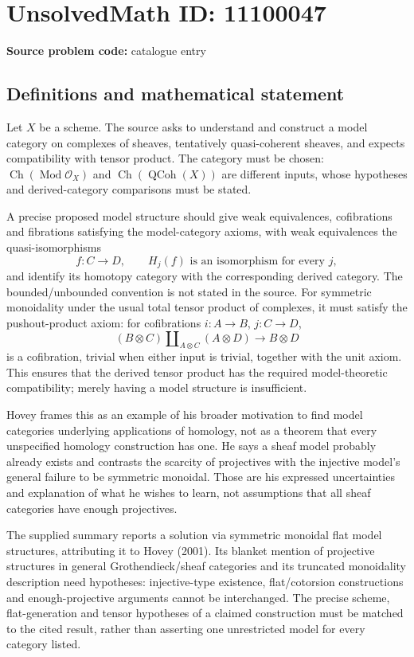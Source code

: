 \documentclass[11pt]{article}
\begin{document}
\section*{UnsolvedMath ID: 11100047}
\textbf{Source problem code:} catalogue entry
\subsection{Definitions and mathematical statement}
Let \(X\) be a scheme. The source asks to understand and construct a model category on complexes of sheaves, tentatively quasi-coherent sheaves, and expects compatibility with tensor product. The category must be chosen: \(\operatorname{Ch}(\operatorname{Mod}\mathcal O_X)\) and \(\operatorname{Ch}(\operatorname{QCoh}(X))\) are different inputs, whose hypotheses and derived-category comparisons must be stated.

A precise proposed model structure should give weak equivalences, cofibrations and fibrations satisfying the model-category axioms, with weak equivalences the quasi-isomorphisms
\[f:C\to D,\qquad H_j(f)\text{ is an isomorphism for every }j,\]
and identify its homotopy category with the corresponding derived category. The bounded/unbounded convention is not stated in the source. For symmetric monoidality under the usual total tensor product of complexes, it must satisfy the pushout-product axiom: for cofibrations \(i:A\to B\), \(j:C\to D\),
\[(B\otimes C)\amalg_{A\otimes C}(A\otimes D)\to B\otimes D\]
is a cofibration, trivial when either input is trivial, together with the unit axiom. This ensures that the derived tensor product has the required model-theoretic compatibility; merely having a model structure is insufficient.

Hovey frames this as an example of his broader motivation to find model categories underlying applications of homology, not as a theorem that every unspecified homology construction has one. He says a sheaf model probably already exists and contrasts the scarcity of projectives with the injective model's general failure to be symmetric monoidal. Those are his expressed uncertainties and explanation of what he wishes to learn, not assumptions that all sheaf categories have enough projectives.

The supplied summary reports a solution via symmetric monoidal flat model structures, attributing it to Hovey (2001). Its blanket mention of projective structures in general Grothendieck/sheaf categories and its truncated monoidality description need hypotheses: injective-type existence, flat/cotorsion constructions and enough-projective arguments cannot be interchanged. The precise scheme, flat-generation and tensor hypotheses of a claimed construction must be matched to the cited result, rather than asserting one unrestricted model for every category listed.
\end{document}
